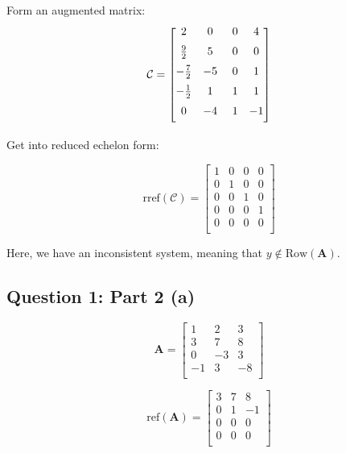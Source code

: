 \documentclass{article}
\begin{document}
Form an augmented matrix:
\[%
    \mathcal{C} = 
    \begin{bmatrix}     \vspace{2mm}
        2            &  0  & \ 0 & 4 \\ \vspace{2mm}
        \frac{9}{2}  &  5  & \ 0 & 0 \\ \vspace{2mm}
        -\frac{7}{2} &  -5 & \ 0 & 1 \\ \vspace{2mm}
        -\frac{1}{2} &  1  & \ 1 & 1 \\ \vspace{2mm}
        0            &  -4 & \ 1 & -1 \\ 
    \end{bmatrix}
\]%

Get into reduced echelon form:

\[%
    \text{rref} (\mathcal{C}) 
    =
    \begin{bmatrix} 
        1 & 0 & 0 & 0 \\
		0 & 1 & 0 & 0 \\
		0 & 0 & 1 & 0 \\
		0 & 0 & 0 & 1 \\
		0 & 0 & 0 & 0 \\		
    \end{bmatrix}
\]%

Here, we have an inconsistent system, meaning that $y \notin
\text{Row}(\mathbf{A})$.

\subsection{Question 1: Part 2 (a)} 


\[%
    \mathbf{A}
    =
    \begin{bmatrix} 
        1 & 2 & 3 \\
		3 & 7 & 8 \\
		0 & -3 & 3 \\
		-1 & 3 & -8 \\		
    \end{bmatrix}
\]%

\[%
    \text{ref} (\mathbf{A}) 
    =
    \begin{bmatrix} 
        3 & 7 & 8 \\
		0 & 1 & -1 \\
		0 & 0 & 0 \\
		0 & 0 & 0 \\		
    \end{bmatrix}
\]%
\end{document}
